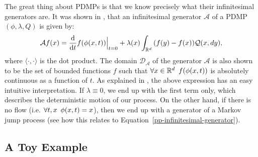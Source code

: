 \documentclass[report.tex]{subfiles}
\begin{document}
The great thing about PDMPs is that we know precisely what their infinitesimal
generators are. It was shown in \cite[Section 26]{davis1993markov}, that an
infinitesimal generator $\mathcal{A}$ of a PDMP $(\phi, \lambda, Q)$ is given by:
\begin{equation}
  \label{pdmp-infinitesimal-generator}
  \mathcal{A}f(x) = \dv{}{t}f(\phi(x, t)) \Bigr|_{t = 0} +
    \lambda(x) \int_{{\mathbb{R}^{d}}}^{{}} {}{(f(y) - f(x))\mathcal{Q}(x, dy)},
\end{equation}
where $\langle \cdot,\cdot \rangle$ is the dot product.
The domain $\mathcal{D}_{\mathcal{A}}$ of the generator $\mathcal{A}$
is also shown to be the set of bounded functions $f$ such that
$\forall x \in \mathbb{R}^{d} \enskip f(\phi(x, t))$ is absolutely continuous
as a function of $t$.
As explained in \cite{davis1993markov}, the above expression has an easy
intuitive interpretation.
If $\lambda \equiv 0$, we end up with the first term only, which describes
the deterministic motion of our process. On the other hand, if there is no flow
(i.e. $\forall t,x \enskip \phi(x, t) = x$), then we end up with a generator of
a Markov jump process (see how this relates to Equation~\ref{pp-infinitesimal-generator}).

\subsection{A Toy Example}
\label{pdmp-toy-example-section}
\end{document}

